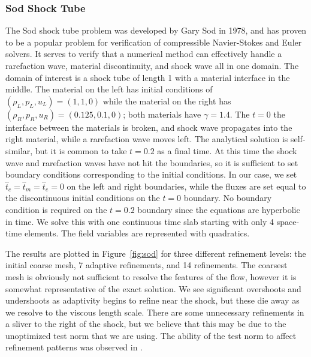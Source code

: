 \documentclass[preprint,12pt]{elsarticle}
\begin{document}
\subsubsection{Sod Shock Tube}
The Sod shock tube problem was developed by Gary Sod in 1978\cite{Sod1978}, and has proven to be a popular problem for verification 
of compressible Navier-Stokes and Euler solvers.
It serves to verify that a numerical method can effectively handle a rarefaction wave, material discontinuity, and shock wave
all in one domain.
The domain of interest is a shock tube of length 1 with a material interface in the middle. The material on the left has initial conditions of 
$(\rho_L,p_L,u_L)=(1,1,0)$ while the material on the right has $(\rho_R,p_R,u_R)=(0.125,0.1,0)$; both materials have $\gamma=1.4$. 
The $t=0$ the interface between the materials is broken, 
and shock wave propagates into the right material, while a rarefaction wave moves left. The analytical solution is self-similar, but it is common to take
$t=0.2$ as a final time.
At this time the shock wave and rarefaction waves have not hit the boundaries, 
so it is sufficient to set boundary conditions corresponding to the initial conditions.
In our case, we set $\hat t_c=\hat t_m=\hat t_e=0$ on the left and right boundaries, while the fluxes are set equal to the discontinuous
initial conditions on the $t=0$ boundary. 
No boundary condition is required on the $t=0.2$ boundary since the equations are hyperbolic in time.
We solve this with one continuous time slab starting with only 4 space-time elements.
The field variables are represented with quadratics.

The results are plotted in Figure~\ref{fig:sod} for three different refinement levels: the initial coarse mesh, 7 adaptive refinements, and 14 refinements.
The coarsest mesh is obviously not sufficient to resolve the features of the flow, 
however it is somewhat representative of the exact solution.
We see significant overshoots and undershoots as adaptivity begins to refine near the shock,
but these die away as we resolve to the viscous length scale.
There are some unnecessary refinements in a sliver to the right of the shock, 
but we believe that this may be due to the unoptimized test norm that we are using.
The ability of the test norm to affect refinement patterns was observed in \cite{EllisLC}.
\end{document}
